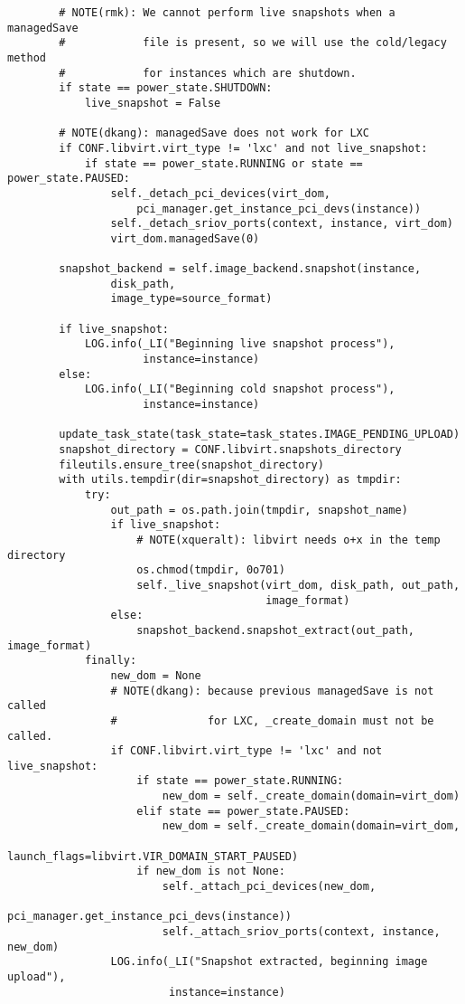 \documentclass[a4paper,left=1.5cm,right=1.5cm,11pt]{article}
\begin{document}
\begin{lstlisting}
        # NOTE(rmk): We cannot perform live snapshots when a managedSave
        #            file is present, so we will use the cold/legacy method
        #            for instances which are shutdown.
        if state == power_state.SHUTDOWN:
            live_snapshot = False

        # NOTE(dkang): managedSave does not work for LXC
        if CONF.libvirt.virt_type != 'lxc' and not live_snapshot:
            if state == power_state.RUNNING or state == power_state.PAUSED:
                self._detach_pci_devices(virt_dom,
                    pci_manager.get_instance_pci_devs(instance))
                self._detach_sriov_ports(context, instance, virt_dom)
                virt_dom.managedSave(0)

        snapshot_backend = self.image_backend.snapshot(instance,
                disk_path,
                image_type=source_format)

        if live_snapshot:
            LOG.info(_LI("Beginning live snapshot process"),
                     instance=instance)
        else:
            LOG.info(_LI("Beginning cold snapshot process"),
                     instance=instance)

        update_task_state(task_state=task_states.IMAGE_PENDING_UPLOAD)
        snapshot_directory = CONF.libvirt.snapshots_directory
        fileutils.ensure_tree(snapshot_directory)
        with utils.tempdir(dir=snapshot_directory) as tmpdir:
            try:
                out_path = os.path.join(tmpdir, snapshot_name)
                if live_snapshot:
                    # NOTE(xqueralt): libvirt needs o+x in the temp directory
                    os.chmod(tmpdir, 0o701)
                    self._live_snapshot(virt_dom, disk_path, out_path,
                                        image_format)
                else:
                    snapshot_backend.snapshot_extract(out_path, image_format)
            finally:
                new_dom = None
                # NOTE(dkang): because previous managedSave is not called
                #              for LXC, _create_domain must not be called.
                if CONF.libvirt.virt_type != 'lxc' and not live_snapshot:
                    if state == power_state.RUNNING:
                        new_dom = self._create_domain(domain=virt_dom)
                    elif state == power_state.PAUSED:
                        new_dom = self._create_domain(domain=virt_dom,
                                launch_flags=libvirt.VIR_DOMAIN_START_PAUSED)
                    if new_dom is not None:
                        self._attach_pci_devices(new_dom,
                            pci_manager.get_instance_pci_devs(instance))
                        self._attach_sriov_ports(context, instance, new_dom)
                LOG.info(_LI("Snapshot extracted, beginning image upload"),
                         instance=instance)


\end{lstlisting}
\end{document}

